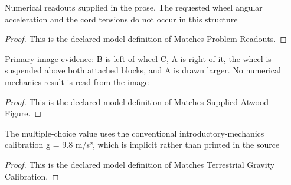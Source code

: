 \begin{definition}
  \label{def:physics:phyx-mini-0783:phyxminiproblems-problemphyxmini0783-matchesproblemreadouts}
  Numerical readouts supplied in the prose. The requested wheel angular acceleration and the cord tensions do not occur in this structure
\end{definition}
\begin{proof}
  This is the declared model definition of Matches Problem Readouts.
\end{proof}
\begin{definition}
  \label{def:physics:phyx-mini-0783:phyxminiproblems-problemphyxmini0783-matchessuppliedatwoodfigure}
  Primary-image evidence: B is left of wheel C, A is right of it, the wheel is suspended above both attached blocks, and A is drawn larger. No numerical mechanics result is read from the image
\end{definition}
\begin{proof}
  This is the declared model definition of Matches Supplied Atwood Figure.
\end{proof}
\begin{definition}
  \label{def:physics:phyx-mini-0783:phyxminiproblems-problemphyxmini0783-matchesterrestrialgravitycalibration}
  The multiple-choice value uses the conventional introductory-mechanics calibration g = 9.8 m/s², which is implicit rather than printed in the source
\end{definition}
\begin{proof}
  This is the declared model definition of Matches Terrestrial Gravity Calibration.
\end{proof}
